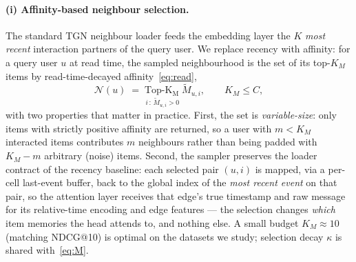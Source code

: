 \paragraph{(i) Affinity-based neighbour selection.}
The standard TGN neighbour loader feeds the embedding layer the $K$ \emph{most
recent} interaction partners of the query user. We replace recency with affinity:
for a query user $u$ at read time, the sampled neighbourhood is the set of its
top-$K_M$ items by read-time-decayed affinity~\eqref{eq:read},
\begin{equation}
\mathcal{N}(u) \;=\;
\operatorname*{Top\text{-}K_M}_{\,i\,:\,\tilde M_{u,i} > 0}\; \tilde M_{u,i},
\qquad K_M \le C,
\label{eq:select}
\end{equation}
with two properties that matter in practice. First, the set is
\emph{variable-size}: only items with strictly positive affinity are returned, so a
user with $m < K_M$ interacted items contributes $m$ neighbours rather than being
padded with $K_M - m$ arbitrary (noise) items. Second, the sampler preserves the
loader contract of the recency baseline: each selected pair $(u,i)$ is mapped, via a
per-cell last-event buffer, back to the global index of the \emph{most recent event}
on that pair, so the attention layer receives that edge's true timestamp and raw
message for its relative-time encoding and edge features --- the selection changes
\emph{which} item memories the head attends to, and nothing else. A small budget
$K_M \approx 10$ (matching NDCG@10) is optimal on the datasets we study; selection
decay $\kappa$ is shared with~\eqref{eq:M}.

